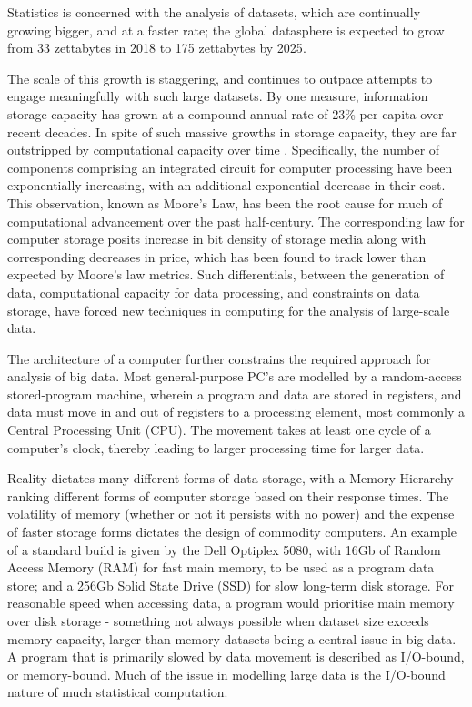 Statistics is concerned with the analysis of datasets, which are
continually growing bigger, and at a faster rate; the global datasphere
is expected to grow from 33 zettabytes in 2018 to 175 zettabytes by
2025\cite{rydning2018digitization}.

The scale of this growth is staggering, and continues to outpace
attempts to engage meaningfully with such large datasets. By one
measure, information storage capacity has grown at a compound annual
rate of 23\% per capita over recent decades\cite{hilbert2011world}. In
spite of such massive growths in storage capacity, they are far
outstripped by computational capacity over time \cite{fontana2018moore}.
Specifically, the number of components comprising an integrated circuit
for computer processing have been exponentially increasing, with an
additional exponential decrease in their cost\cite{moore1975progress}.
This observation, known as Moore's Law, has been the root cause for much
of computational advancement over the past half-century. The
corresponding law for computer storage posits increase in bit density of
storage media along with corresponding decreases in price, which has
been found to track lower than expected by Moore's law metrics. Such
differentials, between the generation of data, computational capacity
for data processing, and constraints on data storage, have forced new
techniques in computing for the analysis of large-scale data.

The architecture of a computer further constrains the required approach
for analysis of big data. Most general-purpose PC's are modelled by a
random-access stored-program machine, wherein a program and data are
stored in registers, and data must move in and out of registers to a
processing element, most commonly a Central Processing Unit (CPU). The
movement takes at least one cycle of a computer's clock, thereby leading
to larger processing time for larger data.

Reality dictates many different forms of data storage, with a Memory
Hierarchy ranking different forms of computer storage based on their
response times\cite{toy1986computer}. The volatility of memory (whether
or not it persists with no power) and the expense of faster storage
forms dictates the design of commodity computers. An example of a
standard build is given by the Dell Optiplex 5080, with 16Gb of Random
Access Memory (RAM) for fast main memory, to be used as a program data
store; and a 256Gb Solid State Drive (SSD) for slow long-term disk
storage\cite{cornell2021standardcomp}. For reasonable speed when
accessing data, a program would prioritise main memory over disk storage
- something not always possible when dataset size exceeds memory
capacity, larger-than-memory datasets being a central issue in big data.
A program that is primarily slowed by data movement is described as
I/O-bound, or memory-bound. Much of the issue in modelling large data is
the I/O-bound nature of much statistical computation.

